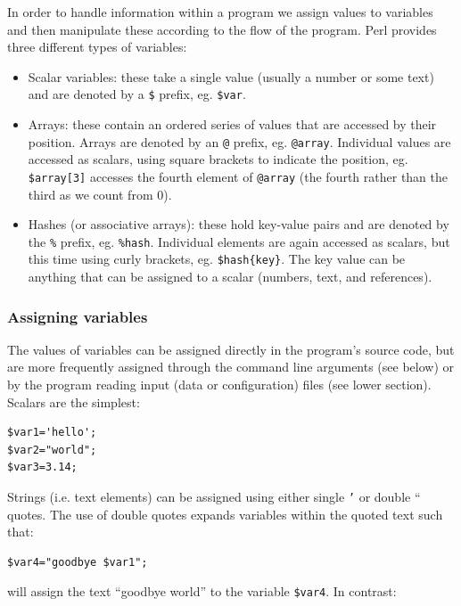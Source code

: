 \documentclass[11pt]{article}
\begin{document}
In order to handle information within a program we assign values to
variables and then manipulate these according to the flow of the
program. Perl provides three different types of variables:

\begin{itemize}
\item Scalar variables: these take a single value (usually a number or some text) 
   and are denoted by a \texttt{\$} prefix, eg. \texttt{\$var}.
\item Arrays: these contain an ordered series of values that are accessed by their
   position. Arrays are denoted by an \texttt{@} prefix, eg. \texttt{@array}.
   Individual values are accessed as scalars, using square brackets to
   indicate the position, eg. \texttt{\$array[3]} accesses the fourth element of
   \texttt{@array} (the fourth rather than the third as we count from 0).
\item Hashes (or associative arrays): these hold key-value pairs and are
   denoted by the \texttt{\%} prefix, eg. \texttt{\%hash}. Individual elements are again
   accessed as scalars, but this time using curly brackets, eg.
   \texttt{\$hash\{key\}}. The key value can be anything that can be assigned to a
   scalar (numbers, text, and references).
\end{itemize}
\subsubsection{Assigning variables}
\label{sec-5-2}


The values of variables can be assigned directly in the program's source
code, but are more frequently assigned through the command line
arguments (see below) or by the program reading input (data or
configuration) files (see lower section). Scalars are the simplest:


\begin{verbatim}
$var1='hello'; 
$var2="world";
$var3=3.14;
\end{verbatim}

Strings (i.e. text elements) can be assigned using either single \texttt{’} or
double `` quotes. The use of double quotes expands variables within the
quoted text such that:


\begin{verbatim}
$var4="goodbye $var1";
\end{verbatim}

will assign the text ``goodbye world'' to the variable \texttt{\$var4}.
In contrast:
\end{document}
